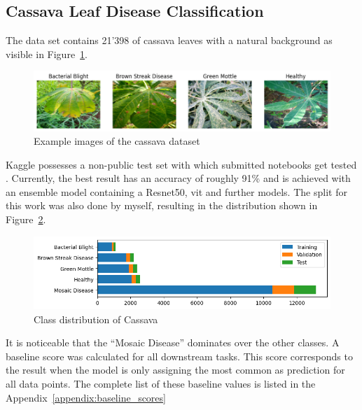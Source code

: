 \subsection{Cassava Leaf Disease Classification}
The data set contains 21'398 of cassava leaves with a natural background as visible in Figure~\ref{fig:example_images_of_cassava}.
\begin{figure}[H]
    \begin{center}
    \includegraphics[width=15cm]{../../images/example_images_of_cassava.png}
    \caption{Example images of the cassava dataset}\label{fig:example_images_of_cassava}
    \end{center}
\end{figure}
Kaggle possesses a non-public test set with which submitted notebooks get tested \autocite{mwebaze2020}. Currently, the best result has an accuracy of roughly 91\% and is achieved with an ensemble model containing a Resnet50, \gls{vit} and further models.  
The split for this work was also done by myself, resulting in the distribution shown in Figure~\ref{fig:class_distribution_of_cassava}.
\begin{figure}[H]
    \begin{center}
    \includegraphics[width=15cm]{../../images/class_distribution_of_cassava.png}
    \caption{Class distribution of Cassava}\label{fig:class_distribution_of_cassava}
    \end{center}
\end{figure}
It is noticeable that the ``Mosaic Disease'' dominates over the other classes. A baseline score was calculated for all downstream tasks. This score corresponds to the result when the model is only assigning the most common as prediction for all data points. The complete list of these baseline values is listed in the Appendix~\ref{appendix:baseline_scores}

